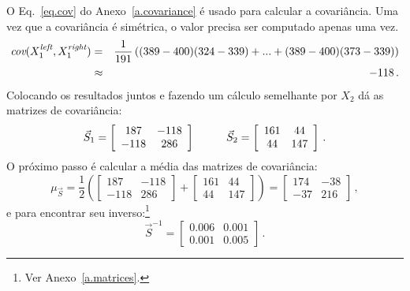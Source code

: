 O Eq.~\ref{eq.cov} do Anexo~\ref{a.covariance} é usado para calcular a covariância. Uma vez que a covariância é simétrica, o valor precisa ser computado apenas uma vez.
\begin{eqnarray*}
\textit{cov}(X_1^{\textit{\scriptsize left}}, X_1^{\textit{\scriptsize right}}) &=& \frac{1}{191} \left((389 - 400)(324 - 339) + ... + (389 - 400)(373 - 339) \right)\\
&\approx& -118\,.
\end{eqnarray*}
Colocando os resultados juntos e fazendo um cálculo semelhante por $X_2$ dá as matrizes de covariância:
\[
\vec{S}_1 = \left[ \begin{array}{c} 187\\-118\end{array} \begin{array}{c} -118\\286 \end{array}\right]
\hspace{10mm}
\vec{S}_2 = \left[ \begin{array}{c} 161\\44\end{array} \begin{array}{c} 44\\147 \end{array}\right]\,.
\]
O próximo passo é calcular a média das matrizes de covariância:
\[
\mu_{\vec{S}} = 
\frac{1}{2}\left(\left[ \begin{array}{c} 187\\-118\end{array} \begin{array}{c} -118\\286 \end{array}\right]+
\left[ \begin{array}{c} 161\\44\end{array} \begin{array}{c} 44\\147 \end{array}\right]\right) = 
\left[ \begin{array}{c} 174\\-37\end{array} \begin{array}{c} -38\\216 \end{array}\right]\,,
\]
e para encontrar seu inverso:\footnote{Ver Anexo~\ref{a.matrices}.}
\[
\vec{S}^{-1} = \left[ \begin{array}{c} 0.006\\0.001\end{array} \begin{array}{c} 0.001\\0.005 \end{array}\right]\,.
\]
